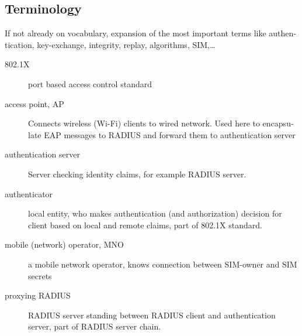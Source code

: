 \documentclass[12pt,a4paper,english]{tutthesis}
\begin{document}
\begin{otherlanguage}{english}
\newpage
\chapter*{Terminology}
\markboth{}{}                                %

If not already on vocabulary, expansion of the most important terms like
authentication, key-exchange, integrity, replay, algorithms, SIM,\ldots{}

\begin{description}
\item[{802.1X}] port based access control standard
\item[{access point, AP}] Connects wireless (Wi-Fi) clients to wired network.
Used here to encapsulate EAP messages to RADIUS and
forward them to authentication server
\end{description}
\begin{description}
\item[{authentication server}] Server checking identity claims, for
example RADIUS server.
\item[{authenticator}] local entity, who makes authentication (and
authorization) decision for client based on local and remote
claims, part of 802.1X standard.
\end{description}
\begin{description}
\item[{mobile (network) operator, MNO}] a mobile network operator, knows connection
between SIM-owner and SIM secrets
\end{description}
\begin{description}
\item[{proxying RADIUS}] RADIUS server standing between RADIUS
client and authentication server, part of RADIUS server chain.
\end{description}



\if@twoside
\cleardoublepage
\fi

\newpage             %
\setcounter{page}{1} %
\renewcommand{\chaptername}{} %


\end{otherlanguage}
\end{document}
